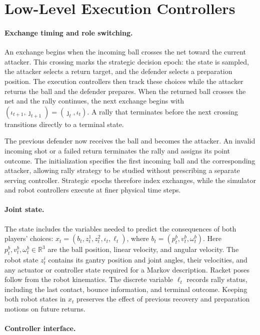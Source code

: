 \documentclass[pmlr]{jmlr}
\newcommand{\R}{\mathbb{R}}
\begin{document}
\section{Low-Level Execution Controllers}
\label{app:execution}
\paragraph{Exchange timing and role switching.}
An exchange begins when the incoming ball crosses the net toward the current attacker. This crossing marks the strategic decision epoch: the state is sampled, the attacker selects a return target, and the defender selects a preparation position. The execution controllers then track these choices while the attacker returns the ball and the defender prepares. When the returned ball crosses the net and the rally continues, the next exchange begins with $(\iota_{t+1},\jmath_{t+1})=(\jmath_t,\iota_t)$. A rally that terminates before the next crossing transitions directly to a terminal state.

The previous defender now receives the ball and becomes the attacker. An invalid incoming shot or a failed return terminates the rally and assigns its point outcome. The initialization specifies the first incoming ball and the corresponding attacker, allowing rally strategy to be studied without prescribing a separate serving controller. Strategic epochs therefore index exchanges, while the simulator and robot controllers execute at finer physical time steps.

\paragraph{Joint state.}
The state includes the variables needed to predict the consequences of both players' choices: $x_t=(b_t,z_t^1,z_t^2,\iota_t,\ell_t)$, where $b_t=(p_t^b,v_t^b,\omega_t^b)$.
Here $p_t^b,v_t^b,\omega_t^b\in\R^3$ are the ball position, linear velocity, and angular velocity. The robot state $z_t^i$ contains its gantry position and joint angles, their velocities, and any actuator or controller state required for a Markov description. Racket poses follow from the robot kinematics. The discrete variable $\ell_t$ records rally status, including the last contact, bounce information, and terminal outcome. Keeping both robot states in $x_t$ preserves the effect of previous recovery and preparation motions on future returns.

\paragraph{Controller interface.}
\end{document}
